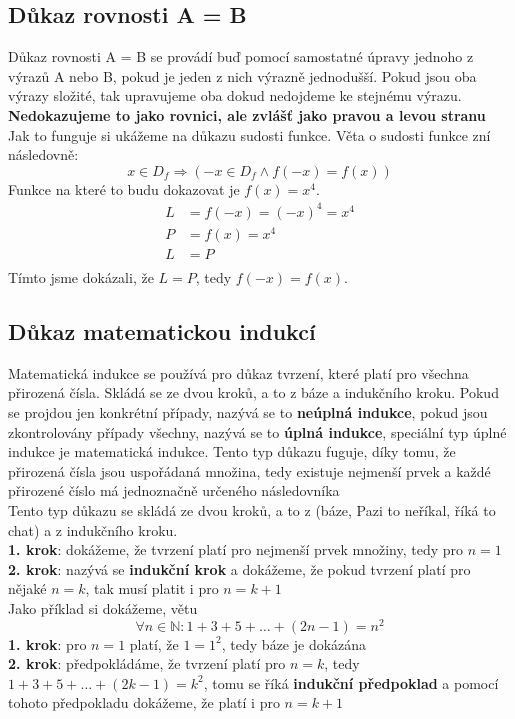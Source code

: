 \documentclass[12pt]{article}
\begin{document}
\subsection*{Důkaz rovnosti A = B}
Důkaz rovnosti A = B se provádí buď pomocí samostatné úpravy jednoho z výrazů A nebo B, pokud je jeden z nich výrazně jednodušší. Pokud jsou oba výrazy složité, tak upravujeme oba dokud nedojdeme ke stejnému výrazu. \textbf{Nedokazujeme to jako rovnici, ale zvlášť jako pravou a levou stranu}
Jak to funguje si ukážeme na důkazu sudosti funkce. Věta o sudosti funkce zní následovně: \[x\in D_f \Rightarrow (-x\in D_f \land f(-x) = f(x))\]
Funkce na které to budu dokazovat je $f(x) = x^4$.
\begin{align*}
L &= f(-x) = (-x)^4 = x^4\\
P &= f(x) = x^4\\
L &= P\\
\end{align*}
Tímto jsme dokázali, že $L = P$, tedy $f(-x) = f(x)$.

\subsection*{Důkaz matematickou indukcí}
Matematická indukce se používá pro důkaz tvrzení, které platí pro všechna přirozená čísla. Skládá se ze dvou kroků, a to z báze a indukčního kroku. Pokud se projdou jen konkrétní případy, nazývá se to \textbf{neúplná indukce}, pokud jsou zkontrolovány případy všechny, nazývá se to \textbf{úplná indukce}, speciální typ úplné indukce je matematická indukce. Tento typ důkazu fuguje, díky tomu, že přirozená čísla jsou uspořádaná množina, tedy existuje nejmenší prvek a každé přirozené číslo má jednoznačně určeného následovníka\\
Tento typ důkazu se skládá ze dvou kroků, a to z (báze, Pazi to neříkal, říká to chat) a z indukčního kroku.\\
\textbf{1. krok}: dokážeme, že tvrzení platí pro nejmenší prvek množiny, tedy pro $n = 1$\\
\textbf{2. krok}: nazývá se \textbf{indukční krok} a dokážeme, že pokud tvrzení platí pro nějaké $n = k$, tak musí platit i pro $n = k + 1$\\
Jako příklad si dokážeme, větu \[\forall n \in \mathbb{N}:1 + 3 + 5 + \dots + (2n-1) = n^2\]
\textbf{1. krok}: pro $n = 1$ platí, že $1 = 1^2$, tedy báze je dokázána\\
\textbf{2. krok}: předpokládáme, že tvrzení platí pro $n = k$, tedy $1 + 3 + 5 + \dots + (2k-1) = k^2$, tomu se říká \textbf{indukční předpoklad} a pomocí tohoto předpokladu dokážeme, že platí i pro $n = k + 1$
\end{document}

